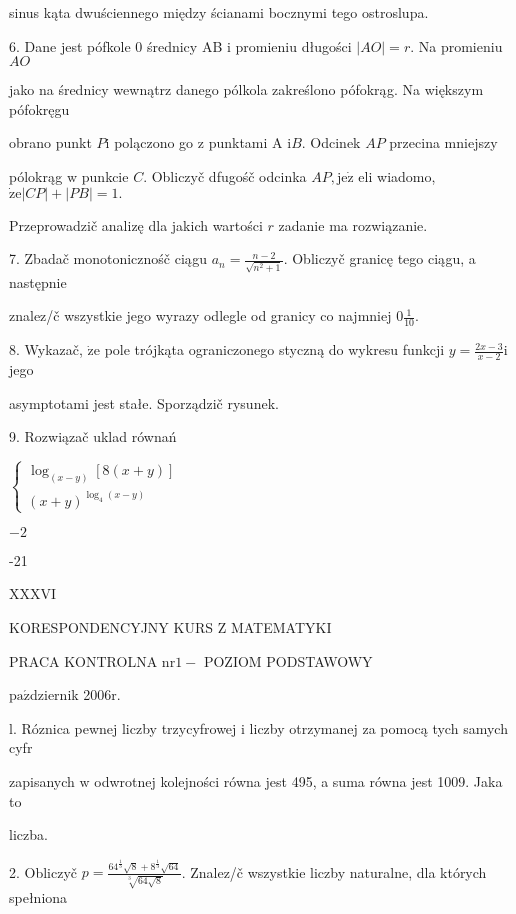 \documentclass[a4paper,12pt]{article}
\begin{document}
sinus kąta dwuściennego między ścianami bocznymi tego ostroslupa.

6. Dane jest pófkole $0$ średnicy AB $\mathrm{i}$ promieniu długości $|AO| = r$. Na promieniu $AO$

jako na średnicy wewnątrz danego pólkola zakreślono pófokrąg. Na większym pófokręgu

obrano punkt $P \mathrm{i}$ polączono go $\mathrm{z}$ punktami A $\mathrm{i} B$. Odcinek $AP$ przecina mniejszy

pólokrąg $\mathrm{w}$ punkcie $C$. Obliczyč dfugośč odcinka $AP, \mathrm{j}\mathrm{e}\dot{\mathrm{z}}$ eli wiadomo, $\dot{\mathrm{z}}\mathrm{e}|CP|+|PB|=1.$

Przeprowadzič analizę dla jakich wartości $r$ zadanie ma rozwiązanie.

7. Zbadač monotonicznośč ciągu $a_{n} = \displaystyle \frac{n-2}{\sqrt{n^{2}+1}}$. Obliczyč granicę tego ciągu, a następnie

znalez/č wszystkie jego wyrazy odlegle od granicy co najmniej $0\displaystyle \frac{1}{10}.$

8. Wykazač, $\dot{\mathrm{z}}\mathrm{e}$ pole trójkąta ograniczonego styczną do wykresu funkcji $y = \displaystyle \frac{2x-3}{x-2} \mathrm{i}$ jego

asymptotami jest stałe. Sporządzič rysunek.

9. Rozwiązač uklad równań

$\left\{\begin{array}{l}
\log_{(x-y)}[8(x+y)]\\
(x+y)^{\log_{4}(x-y)}
\end{array}\right.$

$-2$

-21







XXXVI

KORESPONDENCYJNY KURS Z MATEMATYKI

PRACA KONTROLNA $\mathrm{n}\mathrm{r}1-$ POZIOM PODSTAWOWY

$\mathrm{p}\mathrm{a}\acute{\mathrm{z}}$dziernik 2$006\mathrm{r}.$

l. Róznica pewnej liczby trzycyfrowej $\mathrm{i}$ liczby otrzymanej za pomocą tych samych cyfr

zapisanych $\mathrm{w}$ odwrotnej kolejności równa jest 495, a suma równa jest 1009. Jaka to

liczba.

2. Obliczyč $p=\displaystyle \frac{64^{\frac{1}{3}}\sqrt{8}+8^{\frac{1}{3}}\sqrt{64}}{\sqrt[3]{64\sqrt{8}}}$. Znalez/č wszystkie liczby naturalne, dla których spełniona
\end{document}
